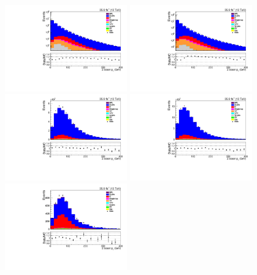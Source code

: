 \begin{figure}[h]
\centering
\includegraphics[width=0.47\textwidth]{figs/background-estimation/plots/unblinded/prompt_ee_ttbarInc/zPairPt_NPL_ee_lepSel_ee_log.pdf}
\includegraphics[width=0.47\textwidth]{figs/background-estimation/plots/unblinded/prompt_mumu_ttbarInc/zPairPt_NPL_mumu_lepSel_mumu_log.pdf}
\\
\includegraphics[width=0.47\textwidth]{figs/background-estimation/plots/unblinded/prompt_ee_ttbarInc/zPairPt_NPL_ee_jetSel_ee.pdf}
\includegraphics[width=0.47\textwidth]{figs/background-estimation/plots/unblinded/prompt_mumu_ttbarInc/zPairPt_NPL_mumu_jetSel_mumu.pdf}
\\
\includegraphics[width=0.47\textwidth]{figs/background-estimation/plots/unblinded/prompt_ee_ttbarInc/zPairPt_NPL_ee_wMass_ee.pdf}

\end{figure}

